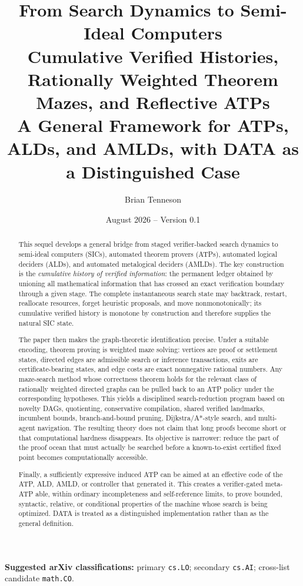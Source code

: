 \documentclass[11pt]{article}
\title{\textbf{From Search Dynamics to Semi-Ideal Computers}\\[0.4em]
\Large Cumulative Verified Histories, Rationally Weighted Theorem Mazes, and Reflective ATPs\\[0.6em]
\large A General Framework for ATPs, ALDs, and AMLDs, with DATA as a Distinguished Case}
\author{Brian Tenneson}
\date{August 2026 -- Version 0.1}
\theoremstyle{remark}
\begin{document}
\maketitle

\begin{center}
\textbf{Suggested arXiv classifications:} primary \texttt{cs.LO}; secondary \texttt{cs.AI}; cross-list candidate \texttt{math.CO}.
\end{center}

\begin{abstract}
This sequel develops a general bridge from staged verifier-backed search dynamics to semi-ideal computers (SICs), automated theorem provers (ATPs), automated logical deciders (ALDs), and automated metalogical deciders (AMLDs). The key construction is the \emph{cumulative history of verified information}: the permanent ledger obtained by unioning all mathematical information that has crossed an exact verification boundary through a given stage. The complete instantaneous search state may backtrack, restart, reallocate resources, forget heuristic proposals, and move nonmonotonically; its cumulative verified history is monotone by construction and therefore supplies the natural SIC state.

The paper then makes the graph-theoretic identification precise. Under a suitable encoding, theorem proving is weighted maze solving: vertices are proof or settlement states, directed edges are admissible search or inference transactions, exits are certificate-bearing states, and edge costs are exact nonnegative rational numbers. Any maze-search method whose correctness theorem holds for the relevant class of rationally weighted directed graphs can be pulled back to an ATP policy under the corresponding hypotheses. This yields a disciplined search-reduction program based on novelty DAGs, quotienting, conservative compilation, shared verified landmarks, incumbent bounds, branch-and-bound pruning, Dijkstra/A*-style search, and multi-agent navigation. The resulting theory does not claim that long proofs become short or that computational hardness disappears. Its objective is narrower: reduce the part of the proof ocean that must actually be searched before a known-to-exist certified fixed point becomes computationally accessible.

Finally, a sufficiently expressive induced ATP can be aimed at an effective code of the ATP, ALD, AMLD, or controller that generated it. This creates a verifier-gated meta-ATP able, within ordinary incompleteness and self-reference limits, to prove bounded, syntactic, relative, or conditional properties of the machine whose search is being optimized. DATA is treated as a distinguished implementation rather than as the general definition.
\end{abstract}

\tableofcontents
\clearpage






\end{document}
